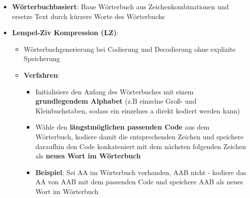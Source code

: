 \begin{itemize}
	\item \textbf{Wörterbuchbasiert}: Baue Wörterbuch aus Zeichenkombinationen und ersetze Text durch kürzere Worte des Wörterbuchs
	\item \textbf{Lempel-Ziv Kompression (LZ)}:
	\begin{itemize}
		\item Wörterbuchgenerierung bei Codierung und Decodierung ohne explizite Speicherung
		\item \textbf{Verfahren}:
		\begin{itemize}
			\item Initialisiere den Anfang des Wörterbuches mit einem \textbf{grundlegendem Alphabet} (z.B einzelne Groß- und Kleinbuchstaben, sodass ein einzelnes a direkt kodiert werden kann)
		 	\item Wähle den \textbf{längstmöglichen passenden Code} aus dem Wörterbuch, kodiere damit die entsprechenden Zeichen und speichere daraufhin den Code konkateniert mit dem nächsten folgenden Zeichen als \textbf{neues Wort im Wörterbuch}
		 	\item \textbf{Beispiel}: Sei AA im Wörterbuch vorhanden, AAB nicht - kodiere das AA von AAB mit dem passenden Code und speichere AAB als neues Wort im Wörterbuch
		 \end{itemize} 
	\end{itemize}
\end{itemize}